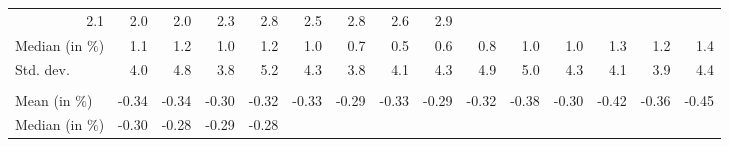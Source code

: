 \begin{tabular}{lllllllllllllll}
  \multicolumn{1}{r}{2.1} &
  \multicolumn{1}{r}{2.0} &
  \multicolumn{1}{r}{2.0} &
  \multicolumn{1}{r}{2.3} &
  \multicolumn{1}{r}{2.8} &
  \multicolumn{1}{r}{2.5} &
  \multicolumn{1}{r}{2.8} &
  \multicolumn{1}{r}{2.6} &
  \multicolumn{1}{r}{2.9} \\
\multicolumn{1}{l}{\hspace{2em}Median (in $\%$)} &
  \multicolumn{1}{|r}{1.1} &
  \multicolumn{1}{r}{1.2} &
  \multicolumn{1}{r}{1.0} &
  \multicolumn{1}{r}{1.2} &
  \multicolumn{1}{r}{1.0} &
  \multicolumn{1}{r}{0.7} &
  \multicolumn{1}{r}{0.5} &
  \multicolumn{1}{r}{0.6} &
  \multicolumn{1}{r}{0.8} &
  \multicolumn{1}{r}{1.0} &
  \multicolumn{1}{r}{1.0} &
  \multicolumn{1}{r}{1.3} &
  \multicolumn{1}{r}{1.2} &
  \multicolumn{1}{r}{1.4} \\
\multicolumn{1}{l}{\hspace{2em}Std. dev.} &
  \multicolumn{1}{|r}{4.0} &
  \multicolumn{1}{r}{4.8} &
  \multicolumn{1}{r}{3.8} &
  \multicolumn{1}{r}{5.2} &
  \multicolumn{1}{r}{4.3} &
  \multicolumn{1}{r}{3.8} &
  \multicolumn{1}{r}{4.1} &
  \multicolumn{1}{r}{4.3} &
  \multicolumn{1}{r}{4.9} &
  \multicolumn{1}{r}{5.0} &
  \multicolumn{1}{r}{4.3} &
  \multicolumn{1}{r}{4.1} &
  \multicolumn{1}{r}{3.9} &
  \multicolumn{1}{r}{4.4} \\
\multicolumn{1}{l}{\hspace{1em}{\textit{Elasticity} ($\widehat{\beta}$)}} &
  \multicolumn{1}{|r}{} &
  \multicolumn{1}{r}{} &
  \multicolumn{1}{r}{} &
  \multicolumn{1}{r}{} &
  \multicolumn{1}{r}{} &
  \multicolumn{1}{r}{} &
  \multicolumn{1}{r}{} &
  \multicolumn{1}{r}{} &
  \multicolumn{1}{r}{} &
  \multicolumn{1}{r}{} &
  \multicolumn{1}{r}{} &
  \multicolumn{1}{r}{} &
  \multicolumn{1}{r}{} &
  \multicolumn{1}{r}{} \\
\multicolumn{1}{l}{\hspace{2em}Mean (in $\%$)} &
  \multicolumn{1}{|r}{-0.34} &
  \multicolumn{1}{r}{-0.34} &
  \multicolumn{1}{r}{-0.30} &
  \multicolumn{1}{r}{-0.32} &
  \multicolumn{1}{r}{-0.33} &
  \multicolumn{1}{r}{-0.29} &
  \multicolumn{1}{r}{-0.33} &
  \multicolumn{1}{r}{-0.29} &
  \multicolumn{1}{r}{-0.32} &
  \multicolumn{1}{r}{-0.38} &
  \multicolumn{1}{r}{-0.30} &
  \multicolumn{1}{r}{-0.42} &
  \multicolumn{1}{r}{-0.36} &
  \multicolumn{1}{r}{-0.45} \\
\multicolumn{1}{l}{\hspace{2em}Median (in $\%$)} &
  \multicolumn{1}{|r}{-0.30} &
  \multicolumn{1}{r}{-0.28} &
  \multicolumn{1}{r}{-0.29} &
  \multicolumn{1}{r}{-0.28} &

\end{tabular}

